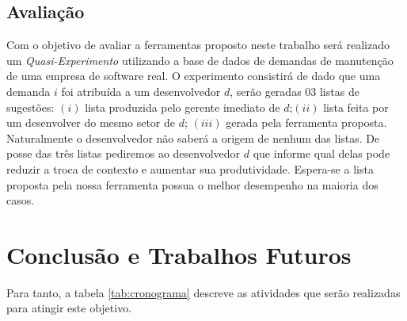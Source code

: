 \documentclass[msc,proposal,hidelot,hideabstract]{ppgccufmg} %
\begin{document}
\section{Avaliação}
\label{sec:avaliacao}

Com o objetivo de avaliar a ferramentas proposto neste trabalho será realizado um
\textit{Quasi-Experimento} \cite{wohlin2012experimentation} utilizando a base de dados de demandas de manutenção de uma empresa
de software real. O experimento consistirá de dado que uma demanda $i$ foi atribuída a um desenvolvedor $d$,
serão geradas 03 listas de sugestões: $(i)$ lista produzida pelo gerente imediato
de $d$;$(ii)$ lista feita por um desenvolver do mesmo setor de $d$; $(iii)$
gerada pela ferramenta proposta. Naturalmente o desenvolvedor não saberá a origem
de nenhum das listas.  De posse das três listas pediremos ao
desenvolvedor $d$ que informe qual delas pode reduzir a troca de contexto e
aumentar sua produtividade. Espera-se a lista proposta pela nossa ferramenta
possua o melhor desempenho na maioria dos casos.

\chapter{Conclusão e Trabalhos Futuros}
\label{ch:conclusao_trab_futuros}

Para tanto, a tabela \ref{tab:cronograma} descreve as atividades que serão realizadas para atingir este objetivo.
\end{document}
